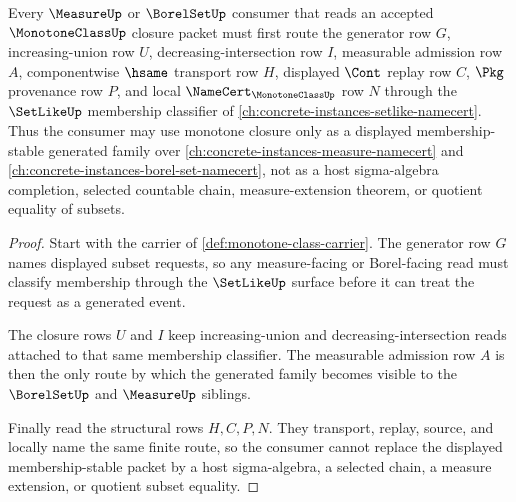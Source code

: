 \begin{theorem}
\label{thm:monotone-class-setlike-measure-dependency-route}
Every $\MeasureUp$ or $\BorelSetUp$ consumer that reads an accepted $\MonotoneClassUp$ closure packet must first route the generator row $G$, increasing-union row $U$, decreasing-intersection row $I$, measurable admission row $A$, componentwise $\hsame$ transport row $H$, displayed $\Cont$ replay row $C$, $\Pkg$ provenance row $P$, and local $\NameCert_{\MonotoneClassUp}$ row $N$ through the $\SetLikeUp$ membership classifier of \autoref{ch:concrete-instances-setlike-namecert}. Thus the consumer may use monotone closure only as a displayed membership-stable generated family over \autoref{ch:concrete-instances-measure-namecert} and \autoref{ch:concrete-instances-borel-set-namecert}, not as a host sigma-algebra completion, selected countable chain, measure-extension theorem, or quotient equality of subsets.
\end{theorem}
\begin{proof}
Start with the carrier of \autoref{def:monotone-class-carrier}. The generator row $G$ names displayed subset requests, so any measure-facing or Borel-facing read must classify membership through the $\SetLikeUp$ surface before it can treat the request as a generated event.

The closure rows $U$ and $I$ keep increasing-union and decreasing-intersection reads attached to that same membership classifier. The measurable admission row $A$ is then the only route by which the generated family becomes visible to the $\BorelSetUp$ and $\MeasureUp$ siblings.

Finally read the structural rows $H,C,P,N$. They transport, replay, source, and locally name the same finite route, so the consumer cannot replace the displayed membership-stable packet by a host sigma-algebra, a selected chain, a measure extension, or quotient subset equality.
\end{proof}

